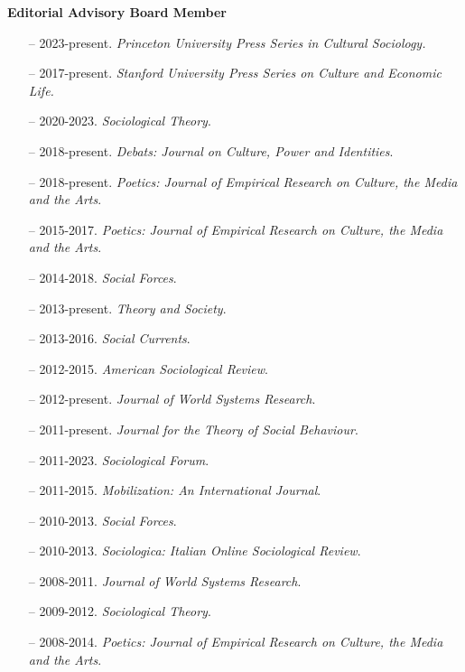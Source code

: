 \medskip
\noindent\textbf{Editorial Advisory Board Member} 

\begin{itemize}[itemsep=-0.5ex]
    \item[--] 2023-present. {\em Princeton University Press Series in Cultural Sociology.}
    \item[--] 2017-present. {\em Stanford University Press Series on Culture and Economic Life.}
    \item[--] 2020-2023. {\em Sociological Theory}.
	\item[--] 2018-present. {\em Debats: Journal on Culture, Power and Identities}. 
    \item[--] 2018-present. {\em Poetics: Journal of Empirical Research on Culture, the Media and the Arts}.
    \item[--] 2015-2017. {\em Poetics: Journal of Empirical Research on Culture, the Media and the Arts}.
    \item[--] 2014-2018. {\em Social Forces}.
    \item[--] 2013-present.  {\em Theory and Society}.
    \item[--] 2013-2016. {\em Social Currents}.
    \item[--] 2012-2015. {\em American Sociological Review}. 
    \item[--] 2012-present. {\em Journal of World Systems Research}.
    \item[--] 2011-present. {\em Journal for the Theory of Social Behaviour}.
    \item[--] 2011-2023. {\em Sociological Forum}.
    \item[--] 2011-2015. {\em Mobilization: An International Journal}.
    \item[--] 2010-2013. {\em Social Forces}.
    \item[--] 2010-2013. {\em Sociologica: Italian Online Sociological Review}.
    \item[--] 2008-2011. {\em Journal of World Systems Research}.
    \item[--] 2009-2012. {\em Sociological Theory}.
    \item[--] 2008-2014. {\em Poetics: Journal of Empirical Research on Culture, the Media and the Arts}.
\end{itemize}